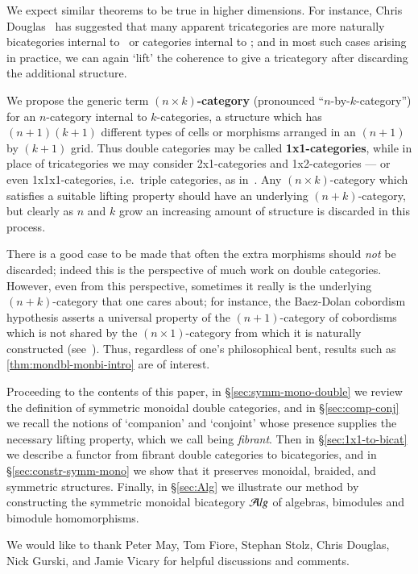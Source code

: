 We expect similar theorems to be true in higher dimensions.  For
instance, Chris Douglas~\cite{douglas:tfttalk} has suggested that many
apparent tricategories are more naturally bicategories internal to
\cCat\ or categories internal to \cTwocat; and in most such cases
arising in practice, we can again `lift' the coherence to give a
tricategory after discarding the additional structure.

We propose the generic term \textbf{$(n\times k)$-category}
(pronounced ``$n$-by-$k$-category'') for an $n$-category internal to
$k$-categories, a structure which has $(n+1)(k+1)$ different types of
cells or morphisms arranged in an $(n+1)$ by $(k+1)$ grid.  Thus
double categories may be called \textbf{1x1-categories}, while in
place of tricategories we may consider 2x1-categories and
1x2-categories --- or even 1x1x1-categories, i.e.\ triple categories,
as in~\cite{gp:intercategories-i,gp:intercategories-ii}.  Any
$(n\times k)$-category which satisfies a suitable lifting property
should have an underlying $(n+k)$-category, but clearly as $n$ and $k$
grow an increasing amount of structure is discarded in this process.


There is a good case to be made that often the extra morphisms should
\emph{not} be discarded; indeed this is the perspective of much work
on double categories.  However, even from this perspective, sometimes
it really is the underlying $(n+k)$-category that one cares about; for
instance, the Baez-Dolan cobordism hypothesis asserts a universal
property of the $(n+1)$-category of cobordisms which is not shared by
the $(n\times 1)$-category from which it is naturally constructed
(see~\cite{lurie:tft}).  Thus, regardless of one's philosophical bent,
results such as \autoref{thm:mondbl-monbi-intro} are of interest.

Proceeding to the contents of this paper, in
\S\ref{sec:symm-mono-double} we review the definition of symmetric
monoidal double categories, and in \S\ref{sec:comp-conj} we recall the
notions of `companion' and `conjoint' whose presence supplies the
necessary lifting property, which we call being \emph{fibrant}.  Then
in \S\ref{sec:1x1-to-bicat} we describe a functor from fibrant double
categories to bicategories, and in \S\ref{sec:constr-symm-mono} we
show that it preserves monoidal, braided, and symmetric structures. Finally, in \S\ref{sec:Alg} we illustrate our method by constructing the symmetric monoidal bicategory ${\mathcal{A}}lg$ of algebras, bimodules and bimodule homomorphisms.

We would like to thank Peter May, Tom Fiore, Stephan Stolz, Chris
Douglas, Nick Gurski, and Jamie Vicary for helpful discussions and comments.

